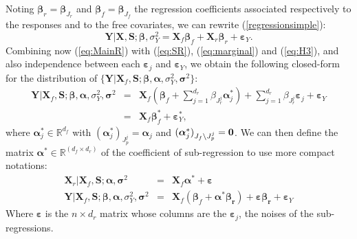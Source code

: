 \documentclass[12pt,a4paper]{report}
\begin{document}
Noting $\boldsymbol{\beta}_r=\boldsymbol{\beta}_{J_r}$ and $\boldsymbol{\beta}_f=\boldsymbol{\beta}_{J_f}$ the regression coefficients associated respectively to the responses and to the free covariates, we can rewrite (\ref{regressionsimple}):
\begin{equation}
			\boldsymbol{Y}{|\boldsymbol{X},\boldsymbol{S}};\boldsymbol{\beta},\sigma_Y^2=\boldsymbol{X}_f\boldsymbol{\beta}_f+\boldsymbol{X}_r\boldsymbol{\beta}_r+\boldsymbol{\varepsilon}_Y. \label{eq:MainR}
\end{equation}
Combining now (\ref{eq:MainR}) with (\ref{eq:SR}), (\ref{eq:marginal}) and (\ref{eq:H3}), and also independence between each $\boldsymbol{\varepsilon}_j$ and $\boldsymbol{\varepsilon}_Y$, we obtain the following closed-form for the distribution of $\{\boldsymbol{Y} |\boldsymbol{X}_f,\boldsymbol{S};\boldsymbol{\beta},\boldsymbol{\alpha},\sigma_Y^2,\boldsymbol{\sigma}^2\}$:
\begin{eqnarray}
	\boldsymbol{Y}|\boldsymbol{X}_f,\boldsymbol{S};\boldsymbol{\beta},\boldsymbol{\alpha},\sigma_Y^2,\boldsymbol{\sigma}^2&=&\boldsymbol{X}_f (\boldsymbol{\beta}_f+ \sum_{j =1}^{d_r}\beta_{J_r^j}\boldsymbol{\alpha}_j^*)+  \sum_{j =1}^{d_r}\beta_{J_r^j}\boldsymbol{\varepsilon}_j+\boldsymbol{\varepsilon}_Y \label{eq:Trueexpl} \\
	&=&\boldsymbol{X}_f\boldsymbol{\beta}_f^*+\boldsymbol{\varepsilon}_Y^*,\label{eq:modexpl}
\end{eqnarray}
where $\boldsymbol{\alpha}^*_j \in \mathbb{R}^{d_f}$ with $(\boldsymbol{\alpha}_j^*)_{J_p^j}=\boldsymbol{\alpha}_j $ and $(\boldsymbol{\alpha}_j^*)_{J_f\setminus J_p^j}=\bf 0 $. We can then define the matrix $\boldsymbol{\alpha}^* \in \mathbb{R}^{(d_f \times d_r)}$ of the coefficient of sub-regression to use more compact notations:
\begin{eqnarray}
	\boldsymbol{X}_r|\boldsymbol{X}_f,\boldsymbol{S};\boldsymbol{\alpha},\boldsymbol{\sigma}^2&=&\boldsymbol{X}_f\boldsymbol{\alpha}^*+\boldsymbol{\varepsilon} \nonumber \\
	\boldsymbol{Y}|\boldsymbol{X}_f,\boldsymbol{S};\boldsymbol{\beta},\boldsymbol{\alpha},\sigma_Y^2,\boldsymbol{\sigma}^2&=&\boldsymbol{X}_f (\boldsymbol{\beta}_f+ \boldsymbol{\alpha}^*\boldsymbol{\beta_{r}})+ \boldsymbol{\varepsilon}\boldsymbol{\beta_{r}}+\boldsymbol{\varepsilon}_Y \label{eq:Trueexpl2}
\end{eqnarray} 
Where $\boldsymbol{\varepsilon}$ is the $n\times d_r$ matrix whose columns are the $\boldsymbol{\varepsilon}_j$, the noises of the sub-regressions.\\
\end{document}

